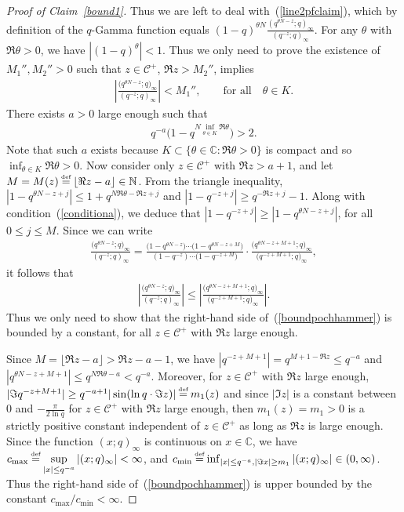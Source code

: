 \documentclass[pdftex]{sigma}
\numberwithin{equation}{section}
\newcommand\myeq{\mathrel{\stackrel{\makebox[0pt]{\mbox{\normalfont\tiny def}}}{=}}}
\newcommand{\C}{\mathbb{C}}
\newcommand{\N}{\mathbb{N}}
\newcommand{\CC}{\mathcal{C}}
\begin{document}
\begin{proof}[Proof of Claim~\ref{bound1}]
Thus we are left to deal with~(\ref{line2pfclaim}), which by def\/inition of the $q$-Gamma function equals $(1 - q)^{\theta N}\frac{(q^{\theta N - z}; q)_{\infty}}{(q^{-z}; q)_{\infty}}$. For any $\theta$ with $\Re\theta > 0$, we have $|(1 - q)^{\theta}| < 1$. Thus we only need to prove the existence of $M_1'', M_2'' > 0$ such that $z\in\CC^+$, $\Re z > M_2''$, implies
\begin{gather}\label{boundthetaN}
\left| \frac{\big(q^{\theta N - z}; q\big)_{\infty}}{(q^{-z}; q)_{\infty}} \right| < M_1'',\qquad \textrm{for all} \quad \theta\in K.
\end{gather}
There exists $a > 0$ large enough such that
\begin{gather}\label{conditiona}
q^{-a} \big( 1 - q^{N\inf_{\theta\in K}{\Re \theta}} \big) > 2.
\end{gather}
Note that such $a$ exists because $K \subset \{\theta\in\C\colon \Re\theta > 0\}$ is compact and so $\inf_{\theta\in K}{\Re \theta} > 0$. Now consider only $z\in\CC^+$ with $\Re z > a+1$, and let $M = M(z) \myeq \lfloor \Re z - a \rfloor\in\N$. From the triangle inequality, $|1 - q^{\theta N - z + j}| \leq 1 + q^{N\Re\theta - \Re z + j}$ and $|1 - q^{-z+j}| \geq q^{-\Re z + j} - 1$. Along with condition~(\ref{conditiona}), we deduce that $|1 - q^{-z+j}| \geq |1 - q^{\theta N - z + j}|$, for all $0\leq j\leq M$. Since we can write
\begin{gather*}
\frac{\big(q^{\theta N - z}; q\big)_{\infty}}{(q^{- z}; q)_{\infty}} = \frac{\big(1 - q^{\theta N - z}\big)\cdots \big(1 - q^{\theta N - z + M}\big)}{(1 - q^{- z})\cdots \big(1 - q^{- z + M}\big)}\cdot\frac{\big(q^{\theta N - z + M + 1}; q\big)_{\infty}}{\big(q^{- z + M + 1}; q\big)_{\infty}},
\end{gather*}
it follows that
\begin{gather}\label{boundpochhammer}
\left| \frac{\big(q^{\theta N - z}; q\big)_{\infty}}{(q^{- z}; q)_{\infty}} \right| \leq \left| \frac{\big(q^{\theta N - z + M + 1}; q\big)_{\infty}}{\big(q^{- z + M + 1}; q\big)_{\infty}} \right|.
\end{gather}
Thus we only need to show that the right-hand side of~(\ref{boundpochhammer}) is bounded by a constant, for all $z\in\CC^+$ with $\Re z$ large enough.

Since $M = \lfloor \Re z - a \rfloor > \Re z - a -1$, we have $|q^{-z + M + 1}| = q^{M + 1 - \Re z} \leq q^{-a}$ and $|q^{\theta N - z + M + 1}| \leq q^{N\Re\theta - a} < q^{-a}$. Moreover, for $z\in\CC^+$ with $\Re z$ large enough, $|\Im q^{-z+M+1}| \geq q^{-a+1}|\sin(\ln{q}\cdot \Im z)| \myeq m_1(z)$ and since $|\Im z|$ is a constant between $0$ and $-\frac{\pi}{2\ln{q}}$ for $z\in\CC^+$ with $\Re z$ large enough, then $m_1(z) = m_1 > 0$ is a strictly positive constant independent of $z\in\CC^+$ as long as $\Re z$ is large enough. Since the function $(x; q)_{\infty}$ is continuous on $x\in\C$, we have $c_{\max} \myeq \sup\limits_{|x| \leq q^{-a}}{|(x; q)_{\infty}|} < \infty$, and $c_{\min} \myeq \inf_{|x|\leq q^{-a}, |\Im x| \geq m_1}{|(x; q)_{\infty}|} \in (0, \infty)$. Thus the right-hand side of~(\ref{boundpochhammer}) is upper bounded by the constant $c_{\max}/c_{\min} < \infty$.
\end{proof}
\end{document}
